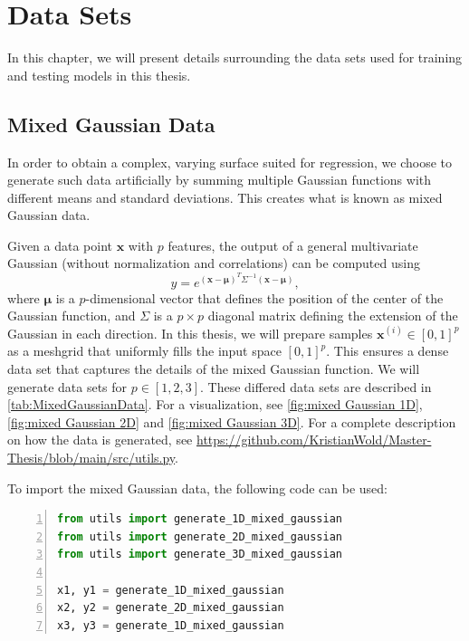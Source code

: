 \chapter{Data Sets}\label{sec:Appendix B}
In this chapter, we will present details surrounding the data sets used for training and testing models in this thesis. 

\section{Mixed Gaussian Data}\label{sec:Mixed Gaussian Data}
In order to obtain a complex, varying surface suited for regression, we choose to generate such data artificially by summing multiple Gaussian functions with different means and standard deviations. This creates what is known as mixed Gaussian data. 

Given a data point $\boldsymbol{x}$ with $p$ features, the output of a general multivariate Gaussian (without normalization and correlations) can be computed using 
\begin{equation}\label{eq:Gaussian}
    y = e^{(\boldsymbol{x} - \boldsymbol{\mu})^T \Sigma^{-1}(\boldsymbol{x} - \boldsymbol{\mu})},
\end{equation}
where $\boldsymbol{\mu}$ is a $p$-dimensional vector that defines the position of the center of the Gaussian function, and $\Sigma$ is a $p\times p$ diagonal matrix defining the extension of the Gaussian in each direction. In this thesis, we will prepare samples $\boldsymbol{x}^{(i)} \in [0,1]^p$ as a meshgrid that uniformly fills the input space $[0,1]^p$. This ensures a dense data set that captures the details of the mixed Gaussian function. We will generate data sets for $p \in[1,2,3].$ These differed data sets are described in \autoref{tab:MixedGaussianData}. For a visualization, see \autoref{fig:mixed Gaussian 1D}, \autoref{fig:mixed Gaussian 2D} and \autoref{fig:mixed Gaussian 3D}. For a complete description on how the data is generated, see \url{https://github.com/KristianWold/Master-Thesis/blob/main/src/utils.py}.

To import the mixed Gaussian data, the following code can be used:
\begin{lstlisting}[language=python, numbers=left]
from utils import generate_1D_mixed_gaussian
from utils import generate_2D_mixed_gaussian
from utils import generate_3D_mixed_gaussian

x1, y1 = generate_1D_mixed_gaussian
x2, y2 = generate_2D_mixed_gaussian
x3, y3 = generate_1D_mixed_gaussian
\end{lstlisting}

